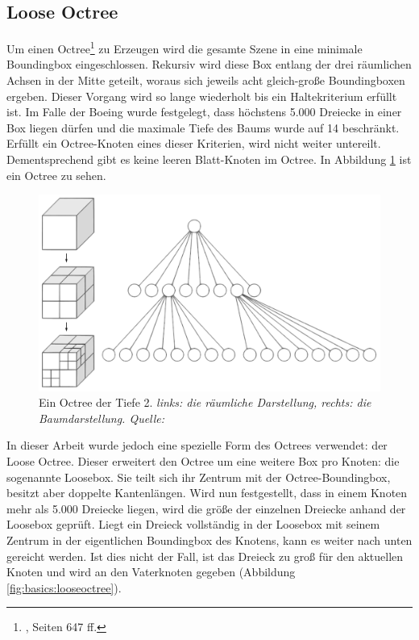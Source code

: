 \subsection{Loose Octree}
\label{sec:basics:octree}
Um einen Octree\footnote{\cite{RTR3}, Seiten 647 ff.} zu Erzeugen wird die gesamte Szene in eine minimale Boundingbox eingeschlossen. Rekursiv wird diese Box entlang der drei räumlichen Achsen in der Mitte geteilt, woraus sich jeweils acht gleich-große Boundingboxen ergeben. Dieser Vorgang wird so lange wiederholt bis ein Haltekriterium erfüllt ist. Im Falle der Boeing wurde festgelegt, dass höchstens 5.000 Dreiecke in einer Box liegen dürfen und die maximale Tiefe des Baums wurde auf 14 beschränkt. Erfüllt ein Octree-Knoten eines dieser Kriterien, wird nicht weiter untereilt. Dementsprechend gibt es keine leeren Blatt-Knoten im Octree. In Abbildung \ref{fig:basics:octree} ist ein Octree zu sehen.\\
\begin{figure}
 \centering
  \includegraphics[scale=0.5]{images/octree.pdf}
  \caption{Ein Octree der Tiefe 2. \textit{links: die räumliche Darstellung, rechts: die Baumdarstellung. Quelle: \cite{wikioctree}}}
 \label{fig:basics:octree}
\end{figure}
In dieser Arbeit wurde jedoch eine spezielle Form des Octrees verwendet: der Loose Octree. Dieser erweitert den Octree um eine weitere Box pro Knoten: die sogenannte Loosebox. Sie teilt sich ihr Zentrum mit der Octree-Boundingbox, besitzt aber doppelte Kantenlängen. Wird nun festgestellt, dass in einem Knoten mehr als 5.000 Dreiecke liegen, wird die größe der einzelnen Dreiecke anhand der Loosebox geprüft. Liegt ein Dreieck vollständig in der Loosebox mit seinem Zentrum in der eigentlichen Boundingbox des Knotens, kann es weiter nach unten gereicht werden. Ist dies nicht der Fall, ist das Dreieck zu groß für den aktuellen Knoten und wird an den Vaterknoten gegeben (Abbildung \ref{fig:basics:looseoctree}).\\
